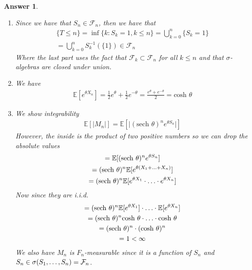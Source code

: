 \documentclass[12pt]{article}
\theoremstyle{colon}
\newtheorem*{answer}{Answer}
\begin{document}
\begin{answer}
  \leavevmode
  \begin{enumerate}[label=\alph*)]
    \item Since we have that $S_n \in \mathcal{F}_n$, then we have that
      \begin{gather*}
        \{T \leq n\} = \inf \{ k : S_k = 1, k \leq n \} = \bigcup_{k = 0}^n \{ S_k = 1 \} \\
        = \bigcup_{k = 0}^n S_k^{-1}(\{1\}) \in \mathcal{F}_n
      \end{gather*}
      Where the last part uses the fact that $\mathcal{F}_k \subset \mathcal{F}_n$ for all $k \leq n$ and that $\sigma$-algebras are closed under union.
    \item We have
      \begin{gather*}
        \mathbb{E}[e^{\theta X_n}] = \frac{1}{2} e^\theta + \frac{1}{2} e^{-\theta} = \frac{e^\theta + e^{-\theta}}{2} = \text{cosh } \theta
      \end{gather*}
    \item We show integrability
      \begin{gather*}
        \mathbb{E}[\lvert M_n \rvert] = \mathbb{E}[\lvert (\text{sech } \theta)^n e^{\theta S_n} \rvert]
      \end{gather*}
      However, the inside is the product of two positive numbers so we can drop the absolute values
      \begin{gather*}
        = \mathbb{E}[(\text{sech } \theta)^n e^{\theta S_n}] \\
        = (\text{sech } \theta)^n \mathbb{E}[e^{\theta (X_1 + \mathellipsis + X_n)}] \\
        = (\text{sech } \theta)^n \mathbb{E}[e^{\theta X_1} \cdot \mathellipsis \cdot e^{\theta X_n}]
      \end{gather*}
      Now since they are i.i.d.
      \begin{gather*}
        = (\text{sech } \theta)^n \mathbb{E}[e^{\theta X_1}] \cdot \mathellipsis \cdot \mathbb{E}[e^{\theta X_n}] \\
        = (\text{sech } \theta)^n \text{cosh } \theta \cdot \mathellipsis \cdot \text{cosh } \theta \\
        = (\text{sech } \theta)^n \cdot (\text{cosh } \theta)^n \\
        = 1 < \infty
      \end{gather*}
      We also have $M_n$ is $F_n$-measurable since it is a function of $S_n$ and $S_n \in \sigma(S_1, \mathellipsis, S_n) = \mathcal{F}_n$.


\end{enumerate}
\end{answer}
\end{document}
